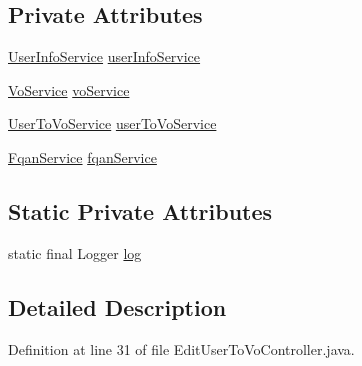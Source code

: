 \subsection*{Private Attributes}
\begin{DoxyCompactItemize}
\item 
\hyperlink{interfaceportal_1_1registration_1_1services_1_1UserInfoService}{UserInfoService} \hyperlink{classportal_1_1registration_1_1controller_1_1EditUserToVoController_adfc9f529073107272adc85ef5af0ba64}{userInfoService}
\item 
\hyperlink{interfaceportal_1_1registration_1_1services_1_1VoService}{VoService} \hyperlink{classportal_1_1registration_1_1controller_1_1EditUserToVoController_a6b47f2cf57b93f14868b6643a7a05647}{voService}
\item 
\hyperlink{interfaceportal_1_1registration_1_1services_1_1UserToVoService}{UserToVoService} \hyperlink{classportal_1_1registration_1_1controller_1_1EditUserToVoController_ab8208b9d0524717c5d5c3b7ce8cfbfd8}{userToVoService}
\item 
\hyperlink{interfaceportal_1_1registration_1_1services_1_1FqanService}{FqanService} \hyperlink{classportal_1_1registration_1_1controller_1_1EditUserToVoController_ae7631577179067193dd0ff2ad24631b1}{fqanService}
\end{DoxyCompactItemize}
\subsection*{Static Private Attributes}
\begin{DoxyCompactItemize}
\item 
static final Logger \hyperlink{classportal_1_1registration_1_1controller_1_1EditUserToVoController_abc91983450be169b71a43139da136573}{log}
\end{DoxyCompactItemize}


\subsection{Detailed Description}


Definition at line 31 of file EditUserToVoController.java.



